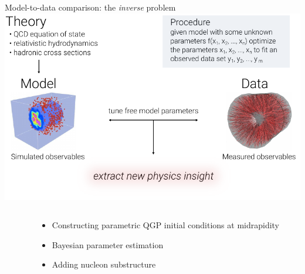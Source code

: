 \documentclass{beamer}
\begin{document}
\begin{frame}{Model-to-data comparison: the \emph{inverse} problem}
  \centering \vspace{0.1\textheight}
  \includegraphics[width=\textwidth]{model2data}
\end{frame}

\begin{frame}[plain]
  \begin{columns}
    \begin{column}{.1\textwidth}
    \end{column}
    \begin{column}{.9\textwidth}
    {\Large
    \begin{itemize}
      \item<1>[\scshape \color{theme} Part I:] Constructing parametric QGP initial conditions at midrapidity\\[1ex]
      \item<0>[\scshape \color{theme} Part II:] Bayesian parameter estimation\\[1ex]
      \item<0>[\scshape \color{theme} Part III:] Adding nucleon substructure
    \end{itemize}
    }%
    \end{column}
  \end{columns}
\end{frame}
\end{document}
